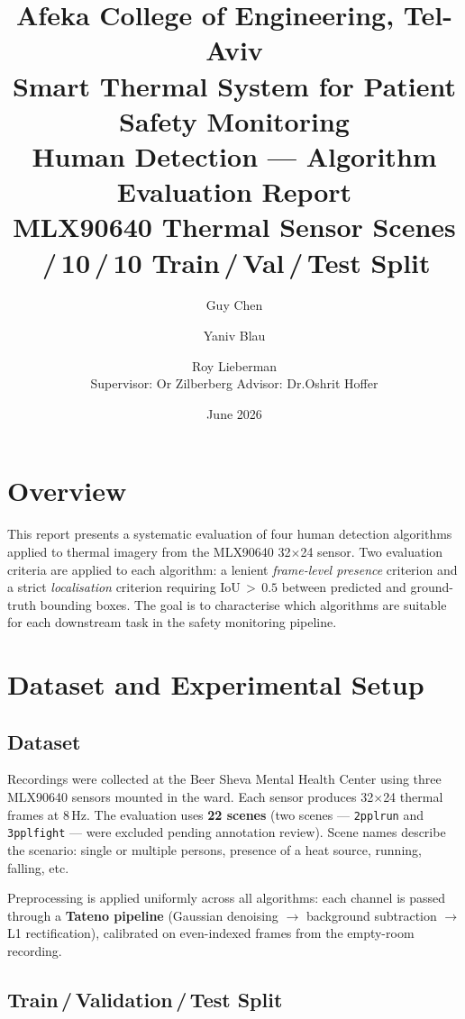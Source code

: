 \documentclass[11pt, a4paper]{article}
\title{%
    {\large Afeka College of Engineering, Tel-Aviv}\\[0.4em]
    {\large Smart Thermal System for Patient Safety Monitoring}\\[0.8em]
    {\LARGE\bfseries Human Detection — Algorithm Evaluation Report}\\[0.4em]
    {\normalsize MLX90640 Thermal Sensor \quad 22 Scenes \quad
     80\,/\,10\,/\,10 Train\,/\,Val\,/\,Test Split}
}
\author{%
    Guy Chen \and Yaniv Blau \and Roy Lieberman\\[0.3em]
    \small Supervisor: Or Zilberberg \qquad Advisor: Dr.\@ Oshrit Hoffer
}
\date{June 2026}
\begin{document}
\maketitle
\tableofcontents
\newpage

\section{Overview}

This report presents a systematic evaluation of four human detection algorithms applied
to thermal imagery from the MLX90640 32$\times$24 sensor.  Two evaluation criteria are
applied to each algorithm: a lenient \emph{frame-level presence} criterion and a strict
\emph{localisation} criterion requiring IoU\,$>\,0.5$ between predicted and ground-truth
bounding boxes.  The goal is to characterise which algorithms are suitable for each
downstream task in the safety monitoring pipeline.

\section{Dataset and Experimental Setup}

\subsection{Dataset}

Recordings were collected at the Beer Sheva Mental Health Center using three MLX90640
sensors mounted in the ward.  Each sensor produces 32$\times$24 thermal frames at 8\,Hz.
The evaluation uses \textbf{22 scenes} (two scenes — \texttt{2pplrun} and
\texttt{3pplfight} — were excluded pending annotation review).  Scene names describe the
scenario: single or multiple persons, presence of a heat source, running, falling, etc.

Preprocessing is applied uniformly across all algorithms: each channel is passed through
a \textbf{Tateno pipeline} (Gaussian denoising $\to$ background subtraction $\to$ L1
rectification), calibrated on even-indexed frames from the empty-room recording.

\subsection{Train\,/\,Validation\,/\,Test Split}
\end{document}
